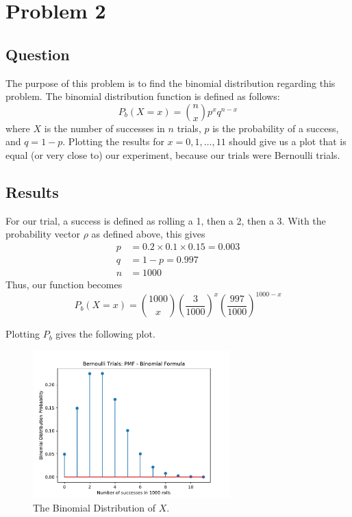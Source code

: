 \documentclass{article}
\begin{document}
\section{Problem 2}
\subsection{Question} The purpose of this problem is to find the
binomial distribution regarding this problem. The binomial
distribution function is defined as follows:
\begin{equation*}
    P_b(X = x) = \binom{n}{x}p^xq^{n-x}
\end{equation*} where \(X\) is the number of successes in \(n\)
trials, \(p\) is the probability of a success, and
\(q = 1 - p\). Plotting the results for \(x = 0, 1, \ldots, 11\)
should give us a plot that is equal (or very close to) our
experiment, because our trials were Bernoulli trials.

\subsection{Results} For our trial, a success is defined
as rolling a 1, then a 2, then a 3. With the probability
vector \(\rho\) as defined above, this gives
\begin{align*}
    p &= 0.2 \times 0.1 \times 0.15 = 0.003 \\
    q &= 1-p = 0.997\\
    n &= 1000
\end{align*} Thus, our function becomes
\begin{equation*}
    P_b(X = x) = \binom{1000}{x} \left(\frac{3}{1000}\right)^x \left(\frac{997}{1000}\right)^{1000-x}
\end{equation*}

Plotting \(P_b\) gives the following plot.

\begin{figure}[H]
    \centering
    \includegraphics[height=162pt]{Images/Figure_2}
    \caption{The Binomial Distribution of \(X\).}
    \label{prob2}
\end{figure}
\end{document}
